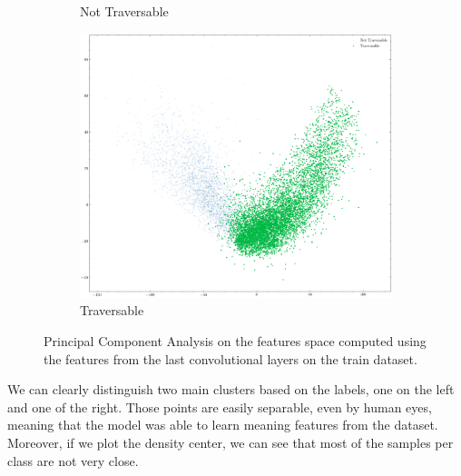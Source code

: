 \documentclass[../document.tex]{subfiles}
\begin{document}
\begin{figure}[H]
\begin{subfigure}[b]{0.48\textwidth}
        \caption{Not Traversable}
    \end{subfigure}
    \begin{subfigure}[b]{0.48\textwidth}
        \includegraphics[width=\linewidth]{../img/5/pca/pca-1.png}
        \caption{Traversable}
    \end{subfigure}
\caption{Principal Component Analysis on the features space computed using the features from the last convolutional layers on the train dataset.}
\end{figure}
We can clearly distinguish two main clusters based on the labels, one on the left and one of the right. Those points are easily separable, even by human eyes, meaning that the model was able to learn meaning features from the dataset. Moreover, if we plot the density center, we can see that most of the samples per class are not very close.
\end{document}
